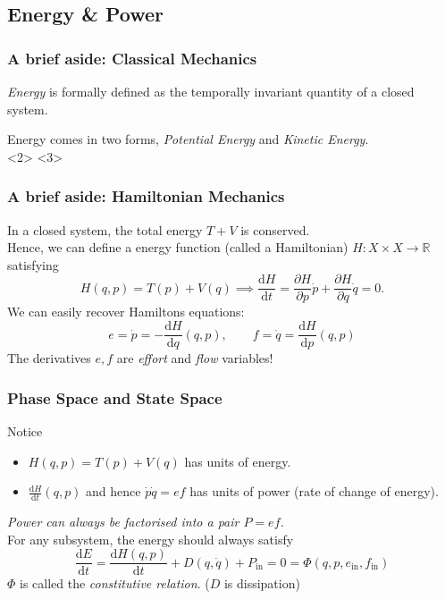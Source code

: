 \documentclass[11pt,reqno]{beamer}
\newcommand{\D}[2]{\frac{\mathrm{d} #1}{\mathrm{d} #2}}
\renewcommand{\P}[2]{\frac{\partial #1}{\partial #2}}
\begin{document}
\subsection{Energy \& Power}
\begin{frame}
\frametitle{A brief aside: Classical Mechanics}
\emph{Energy} is formally defined as the temporally invariant quantity of a closed system.\\
\vspace{12pt}

Energy comes in two forms, \emph{Potential Energy} and \emph{Kinetic Energy}.\\
\vspace{12pt}
<2>
<3>
\end{frame}
\begin{frame}
\frametitle{A brief aside: Hamiltonian Mechanics}
In a closed system, the total energy $T+V$ is conserved.\\
Hence, we can define a energy function (called a Hamiltonian) $H:X\times X \rightarrow \mathbb{R}$ satisfying
\[
H(q,p) = T(p) + V(q) \implies \D{H}{t} = \P{H}{p}\dot{p} + \P{H}{q}\dot{q} = 0.
\]
We can easily recover Hamiltons equations:
\[
e = \dot{p} = -\D{H}{q}(q,p) ,\qquad f = \dot{q} = \D{H}{p}(q,p)
\]
The derivatives $e, f$ are \emph{effort} and \emph{flow} variables!
\end{frame}
\begin{frame}
\frametitle{Phase Space and State Space}
Notice
\begin{itemize}
	\item $H(q,p) =T(p) + V(q)$ has units of energy.
	\item $\D{H}{t}(q,p)$ and hence $\dot{p}\dot{q} = ef$  has units of power (rate of change of energy).
\end{itemize}
\emph{Power can always be factorised into a pair $P = ef$.} \\
\vspace{10pt}
For any subsystem, the energy should always satisfy
\[
\D{E}{t} = \D{H(q,p)}{t}  + D(q,\dot{q}) + P_\text{in} = 0 = \Phi(q,p, e_\text{in},f_\text{in})
\]
$\Phi$ is called the \emph{constitutive relation}. ($D$ is dissipation)
\end{frame}
\end{document}
